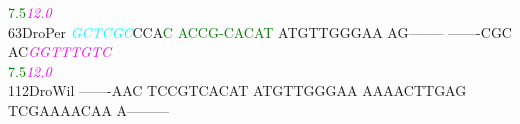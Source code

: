 \documentclass[11pt,twoside,reqno,a4paper]{article}
\begin{document}
{\hspace*{4\charwidth}\hspace*{7\charwidth}\hspace*{9\charwidth}\textcolor{green}{7.5}\hspace*{1\charwidth}\hspace*{1\charwidth}\hspace*{1\charwidth}\hspace*{1\charwidth}\hspace*{1\charwidth}\hspace*{40\charwidth}\textit{\textcolor{magenta}{12.0}}\hspace*{1\charwidth}\\
63\hspace*{2\charwidth}DroPer	\textit{\textcolor{cyan}{G}}\textit{\textcolor{cyan}{C}}\textit{\textcolor{cyan}{T}}\textit{\textcolor{cyan}{C}}\textit{\textcolor{cyan}{G}}\textit{\textcolor{cyan}{C}}CCA\textcolor{green}{C}	\textcolor{green}{A}\textcolor{green}{C}\textcolor{green}{C}\textcolor{green}{G}\textcolor{green}{-}\textcolor{green}{C}\textcolor{green}{A}\textcolor{green}{C}\textcolor{green}{A}\textcolor{green}{T}	ATGTTGGGAA	AG--------	-------CGC	AC\textit{\textcolor{magenta}{G}}\textit{\textcolor{magenta}{G}}\textit{\textcolor{magenta}{T}}\textit{\textcolor{magenta}{T}}\textit{\textcolor{magenta}{T}}\textit{\textcolor{magenta}{G}}\textit{\textcolor{magenta}{T}}\textit{\textcolor{magenta}{C}}	\\
\hspace*{4\charwidth}\hspace*{7\charwidth}\hspace*{9\charwidth}\textcolor{green}{7.5}\hspace*{1\charwidth}\hspace*{1\charwidth}\hspace*{1\charwidth}\hspace*{1\charwidth}\hspace*{1\charwidth}\hspace*{40\charwidth}\textit{\textcolor{magenta}{12.0}}\hspace*{1\charwidth}\\
112\hspace*{1\charwidth}DroWil	-------AAC	TCCGTCACAT	ATGTTGGGAA	AAAACTTGAG	TCGAAAACAA	A---------	\\
\hspace*{4\charwidth}\hspace*{7\charwidth}\hspace*{1\charwidth}\hspace*{1\charwidth}\hspace*{1\charwidth}\hspace*{1\charwidth}\hspace*{1\charwidth}\hspace*{1\charwidth}\\
}
\end{document}
